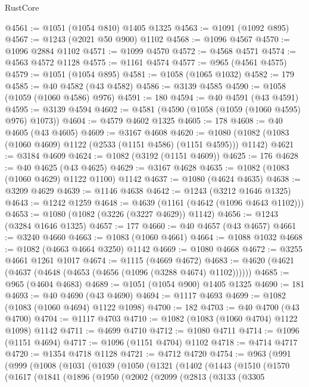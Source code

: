 \begin{lexlean}{RustCore}
\begin{coremodule}
@4561 := @1051 (@1054 @810) @1405 @1325
@4563 := @1091 (@1092 @895)
@4567 := @1243 (@2021 @50 @900) @1102
@4568 := @1096 @4567
@4570 := @1096 @2884 @1102
@4571 := @1099 @4570
@4572 := @4568 @4571
@4574 := @4563 @4572 @1128
@4575 := @1161 @4574
@4577 := @965 (@4561 @4575)
@4579 := @1051 (@1054 @895)
@4581 := @1058 (@1065 @1032)
@4582 := 179
@4585 := @40 @4582 (@43 @4582)
@4586 := @3139 @4585
@4590 := @1058 (@1059 (@1060 @4586) @976)
@4591 := 180
@4594 := @40 @4591 (@43 @4591)
@4595 := @3139 @4594
@4602 := @4581 (@4590 (@1058 (@1059 (@1060 @4595) @976) @1073))
@4604 := @4579 @4602 @1325
@4605 := 178
@4608 := @40 @4605 (@43 @4605)
@4609 := @3167 @4608
@4620 := @1080 (@1082 (@1083 (@1060 @4609) @1122 (@2533 (@1151 @4586) (@1151 @4595))) @1142)
@4621 := @3184 @4609
@4624 := @1082 (@3192 (@1151 @4609))
@4625 := 176
@4628 := @40 @4625 (@43 @4625)
@4629 := @3167 @4628
@4635 := @1082 (@1083 (@1060 @4629) @1122 @1100) @1142
@4637 := @1080 (@4624 @4635)
@4638 := @3209 @4629
@4639 := @1146 @4638
@4642 := @1243 (@3212 @1646 @1325)
@4643 := @1242 @1259
@4648 := @4639 (@1161 (@4642 (@1096 @4643 @1102)))
@4653 := @1080 (@1082 (@3226 (@3227 @4629)) @1142)
@4656 := @1243 (@3284 @1646 @1325)
@4657 := 177
@4660 := @40 @4657 (@43 @4657)
@4661 := @3240 @4660
@4663 := @1083 (@1060 @4661)
@4664 := @1088 @1032
@4668 := @1082 (@4663 @4664 @3250) @1142
@4669 := @1080 @4668
@4672 := @3255 @4661 @1261 @1017
@4674 := @1115 (@4669 @4672)
@4683 := @4620 (@4621 (@4637 (@4648 (@4653 (@4656 (@1096 (@3288 @4674) @1102))))))
@4685 := @965 (@4604 @4683)
@4689 := @1051 (@1054 @900) @1405 @1325
@4690 := 181
@4693 := @40 @4690 (@43 @4690)
@4694 := @1117 @4693
@4699 := @1082 (@1083 (@1060 @4694) @1122 @1098)
@4700 := 182
@4703 := @40 @4700 (@43 @4700)
@4704 := @1117 @4703
@4710 := @1082 (@1083 (@1060 @4704) @1122 @1098) @1142
@4711 := @4699 @4710
@4712 := @1080 @4711
@4714 := @1096 (@1151 @4694)
@4717 := @1096 (@1151 @4704) @1102
@4718 := @4714 @4717
@4720 := @1354 @4718 @1128
@4721 := @4712 @4720
@4754 := @963
    (@991
      (@999
        (@1008
          (@1031
            (@1039
              (@1050
                (@1321
                  (@1402
                    (@1443
                      (@1510
                        (@1570
                          (@1617
                            (@1841
                              (@1896
                                (@1950
                                  (@2002
                                    (@2099
                                      (@2813
                                        (@3133
                                          (@3305

\end{coremodule}
\end{lexlean}
